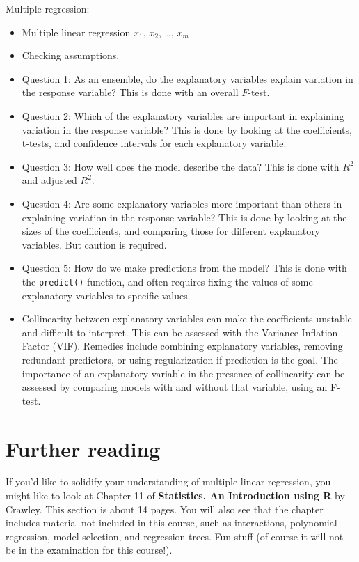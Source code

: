 \documentclass[
  letterpaper,
  8pt,
  a4paper]{book}
\providecommand{\tightlist}{%
  \setlength{\itemsep}{0pt}\setlength{\parskip}{0pt}}
\begin{document}
Multiple regression:

\begin{itemize}
\tightlist
\item
  Multiple linear regression \(x_1\), \(x_2\), \ldots, \(x_m\)
\item
  Checking assumptions.
\item
  Question 1: As an ensemble, do the explanatory variables explain
  variation in the response variable? This is done with an overall
  \(F\)-test.
\item
  Question 2: Which of the explanatory variables are important in
  explaining variation in the response variable? This is done by looking
  at the coefficients, t-tests, and confidence intervals for each
  explanatory variable.
\item
  Question 3: How well does the model describe the data? This is done
  with \(R^2\) and adjusted \(R^2\).
\item
  Question 4: Are some explanatory variables more important than others
  in explaining variation in the response variable? This is done by
  looking at the sizes of the coefficients, and comparing those for
  different explanatory variables. But caution is required.
\item
  Question 5: How do we make predictions from the model? This is done
  with the \texttt{predict()} function, and often requires fixing the
  values of some explanatory variables to specific values.
\item
  Collinearity between explanatory variables can make the coefficients
  unstable and difficult to interpret. This can be assessed with the
  Variance Inflation Factor (VIF). Remedies include combining
  explanatory variables, removing redundant predictors, or using
  regularization if prediction is the goal. The importance of an
  explanatory variable in the presence of collinearity can be assessed
  by comparing models with and without that variable, using an F-test.
\end{itemize}

\section*{Further reading}\label{further-reading-4}


If you'd like to solidify your understanding of multiple linear
regression, you might like to look at Chapter 11 of \textbf{Statistics.
An Introduction using R} by Crawley. This section is about 14 pages. You
will also see that the chapter includes material not included in this
course, such as interactions, polynomial regression, model selection,
and regression trees. Fun stuff (of course it will not be in the
examination for this course!).
\end{document}
